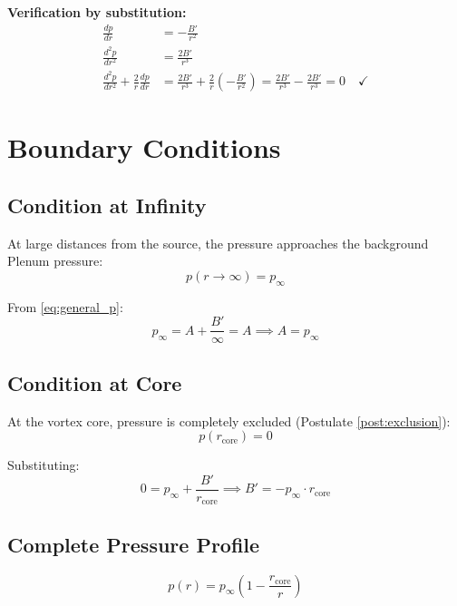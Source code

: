 \documentclass[12pt,a4paper,openany]{book}
\theoremstyle{definition}
\theoremstyle{plain}
\theoremstyle{remark}
\newcommand{\rcore}{r_{\text{core}}}       %
\newcommand{\pinfty}{p_\infty}             %
\begin{document}
\textbf{Verification by substitution:}
\begin{align}
\frac{dp}{dr} &= -\frac{B'}{r^2} \\
\frac{d^2p}{dr^2} &= \frac{2B'}{r^3} \\
\frac{d^2p}{dr^2} + \frac{2}{r}\frac{dp}{dr} &= \frac{2B'}{r^3} + \frac{2}{r}\left(-\frac{B'}{r^2}\right) = \frac{2B'}{r^3} - \frac{2B'}{r^3} = 0 \quad \checkmark
\end{align}

\section{Boundary Conditions}

\subsection{Condition at Infinity}

At large distances from the source, the pressure approaches the background Plenum pressure:
\begin{equation}
p(r \to \infty) = \pinfty
\label{eq:bc_inf}
\end{equation}

From \cref{eq:general_p}:
\begin{equation}
\pinfty = A + \frac{B'}{∞} = A \implies A = \pinfty
\label{eq:A_value}
\end{equation}

\subsection{Condition at Core}

At the vortex core, pressure is completely excluded (Postulate \ref{post:exclusion}):
\begin{equation}
p(\rcore) = 0
\label{eq:bc_core}
\end{equation}

Substituting:
\begin{equation}
0 = \pinfty + \frac{B'}{\rcore} \implies B' = -\pinfty \cdot \rcore
\label{eq:B_value}
\end{equation}

\subsection{Complete Pressure Profile}

\begin{derivedbox}
\begin{equation}
\boxed{p(r) = \pinfty\left(1 - \frac{\rcore}{r}\right)}
\label{eq:pressure_final}
\end{equation}
\end{derivedbox}
\end{document}
